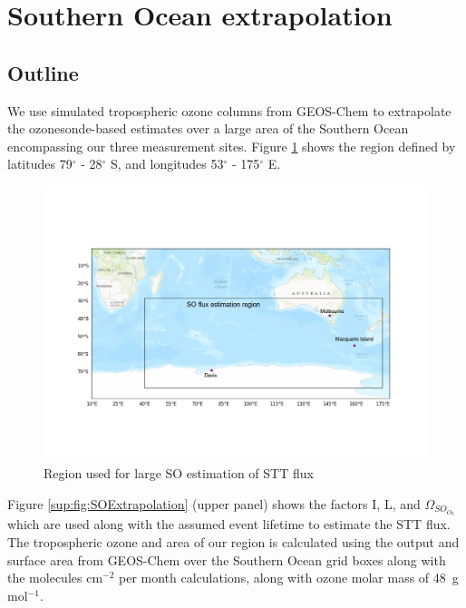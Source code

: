 \section{Southern Ocean extrapolation}
  \label{sup:sec:SOExtrapolation}

  \subsection{Outline}
    We use simulated tropospheric ozone columns from GEOS-Chem to extrapolate the ozonesonde-based estimates over a large area of the Southern Ocean encompassing our three measurement sites. 
    Figure \ref{sup:fig:SORegion} shows the region defined by latitudes 79$^{\circ}$ - 28$^{\circ}$ S, and longitudes 53$^{\circ}$ - 175$^{\circ}$ E.
    
    \begin{figure}[t]
      \includegraphics[width=12.0cm]{../figures/OzoneSORegion.png}
      \caption{%
	Region used for large SO estimation of STT flux}
      \label{sup:fig:SORegion}
    \end{figure}
    
    
    
    Figure \ref{sup:fig:SOExtrapolation} (upper panel) shows the factors I, L, and $\Omega_{SO_{O_3}}$ which are used along with the assumed event lifetime to estimate the STT flux.
    The tropospheric ozone and area of our region is calculated using the output and surface area from GEOS-Chem over the Southern Ocean grid boxes along with the molecules cm$^{-2}$ per month calculations, along with ozone molar mass of 48~g mol$^{-1}$.
    
